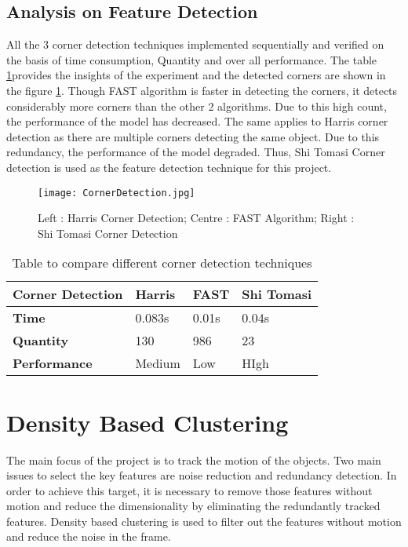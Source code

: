 \subsection{Analysis on Feature Detection}
All the 3 corner detection techniques implemented sequentially and verified on the basis of time consumption, Quantity and over all performance. The table \ref{table:1}provides the insights of the experiment and the detected corners are shown in the figure \ref{fig:CornerDetection}. Though FAST algorithm is faster in detecting the corners, it detects considerably more corners than the other 2 algorithms. Due to this high count, the performance of the model has decreased. The same applies to Harris corner detection as there are multiple corners detecting the same object. Due to this redundancy, the performance of the model degraded. Thus, Shi Tomasi Corner detection is used as the feature detection technique for this project.
\begin{figure}[tb]
	\center\texttt{[image: CornerDetection.jpg]}
	\caption{Left : Harris Corner Detection; Centre : FAST Algorithm; Right : Shi Tomasi Corner Detection}
	\label{fig:CornerDetection}
\end{figure}

\begin{table}[h!]
\centering
 \begin{tabular}{|p{4cm} ||p{3cm} p{3cm} p{3cm}|} 
 \hline
 \textbf{Corner Detection} & \textbf{Harris}  & \textbf{FAST} & \textbf{Shi Tomasi} \\
 \hline\hline
 \textbf{Time} & 0.083s & 0.01s & 0.04s \\
 \hline
 \textbf{Quantity} & 130 & 986 & 23 \\
 \hline
 \textbf{Performance} & Medium & Low & HIgh \\
 \hline
\end{tabular}
\caption{Table to compare different corner detection techniques}
\label{table:1}
\end{table}

\section{Density Based Clustering}
The main focus of the project is to track the motion of the objects. Two main issues to select the key features are noise reduction and redundancy detection. In order to achieve this target, it is necessary to remove those features without motion and reduce the dimensionality by eliminating the redundantly tracked features. Density based clustering is used to filter out the features without motion and reduce the noise in the frame.
